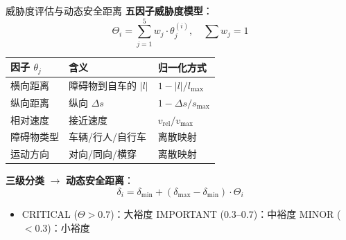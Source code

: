 \documentclass[aspectratio=169,10pt,fontset=none]{ctexbeamer}
\begin{document}
\begin{frame}{威胁度评估与动态安全距离}
  \textbf{五因子威胁度模型}：
  \[
    \Theta_i = \sum_{j=1}^{5} w_j \cdot \theta_j^{(i)}, \quad \sum w_j = 1
  \]

  \vspace{-0.2cm}
  \begin{table}
    \small
    \begin{tabular}{lll}
      \toprule
      因子 $\theta_j$ & 含义 & 归一化方式 \\
      \midrule
      横向距离 & 障碍物到自车的 $|l|$ & $1 - |l|/l_{\max}$ \\
      纵向距离 & 纵向 $\Delta s$ & $1 - \Delta s / s_{\max}$ \\
      相对速度 & 接近速度 & $v_{\text{rel}} / v_{\max}$ \\
      障碍物类型 & 车辆/行人/自行车 & 离散映射 \\
      运动方向 & 对向/同向/横穿 & 离散映射 \\
      \bottomrule
    \end{tabular}
  \end{table}

  \vspace{0.2cm}
  \textbf{三级分类} $\to$ \textbf{动态安全距离}：
  \[
    \delta_i = \delta_{\min} + (\delta_{\max} - \delta_{\min}) \cdot \Theta_i
  \]

  \begin{itemize}
    \item CRITICAL ($\Theta > 0.7$)：大裕度 \quad
    IMPORTANT ($0.3\text{--}0.7$)：中裕度 \quad
    MINOR ($< 0.3$)：小裕度
  \end{itemize}
\end{frame}
\end{document}

